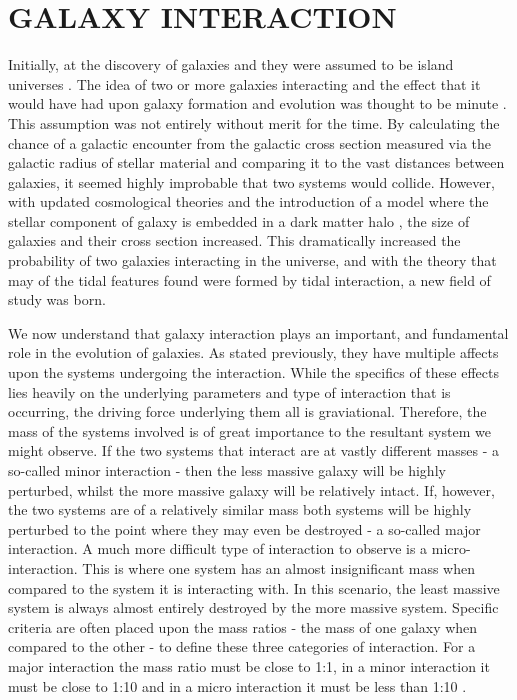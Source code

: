 \section{GALAXY INTERACTION}
Initially, at the discovery of galaxies and they were assumed to be island universes \citep{Hubble paper}. The idea of two or more galaxies interacting and the effect that it would have had upon galaxy formation and evolution was thought to be minute \citep{Found this info in Chapter 8 of Binne and Tremaine. Need to find a better source!}. This assumption was not entirely without merit for the time. By calculating the chance of a galactic encounter from the galactic cross section measured via the galactic radius of stellar material and comparing it to the vast distances between galaxies, it seemed highly improbable that two systems would collide. However, with updated cosmological theories and the introduction of a model where the stellar component of galaxy is embedded in a dark matter halo \citep{Which paper introduced the idea of a galactic halo?}, the size of galaxies and their cross section increased. This dramatically increased the probability of two galaxies interacting in the universe, and with the theory that may of the tidal features found were formed by tidal interaction, a new field of study was born. 

We now understand that galaxy interaction plays an important, and fundamental role in the evolution of galaxies. As stated previously, they have multiple affects upon the systems undergoing the interaction. While the specifics of these effects lies heavily on the underlying parameters and type of interaction that is occurring, the driving force underlying them all is graviational. Therefore, the mass of the systems involved is of great importance to the resultant system we might observe. If the two systems that interact are at vastly different masses - a so-called minor interaction - then the less massive galaxy will be highly perturbed, whilst the more massive galaxy will be relatively intact. If, however, the two systems are of a relatively similar mass both systems will be highly perturbed to the point where they may even be destroyed - a so-called major interaction. A much more difficult type of interaction to observe is a micro-interaction. This is where one system has an almost insignificant mass when compared to the system it is interacting with. In this scenario, the least massive system is always almost entirely destroyed by the more massive system. Specific criteria are often placed upon the mass ratios - the mass of one galaxy when compared to the other - to define these three categories of interaction. For a major interaction the mass ratio must be close to 1:1, in a minor interaction it must be close to 1:10 and in a micro interaction it must be less than 1:10 \citep{A paper that states what the accepted merger ratios are?}. 

